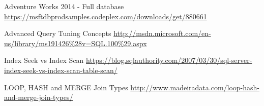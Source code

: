 \begin{thebibliography}{99999}
\singlespace\normalsize

 Adventure Works 2014 - Full database \url{https://msftdbprodsamples.codeplex.com/downloads/get/880661}


 Advanced Query Tuning Concepts \url{http://msdn.microsoft.com/en-us/library/ms191426\%28v=SQL.100\%29.aspx}

 Index Seek vs Index Scan
\url{https://blog.sqlauthority.com/2007/03/30/sql-server-index-seek-vs-index-scan-table-scan/}

 LOOP, HASH and MERGE Join Types
\url{http://www.madeiradata.com/loop-hash-and-merge-join-types/}

\end{thebibliography}
